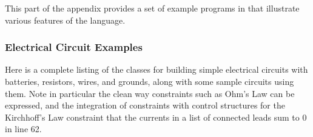 This part of the appendix provides a set of example programs in
\toolname that illustrate various features of the language.

\subsubsection{Electrical Circuit Examples}
\label{sec:electrical-circuits}

Here is a complete listing of the classes for building simple
electrical circuits with batteries, resistors, wires, and grounds,
along with some sample circuits using them.  Note in particular the
clean way constraints such as Ohm's Law can be expressed, and the
integration of constraints with control structures for the Kirchhoff's
Law constraint that the currents in a list of connected leads sum to 0
in line 62.

